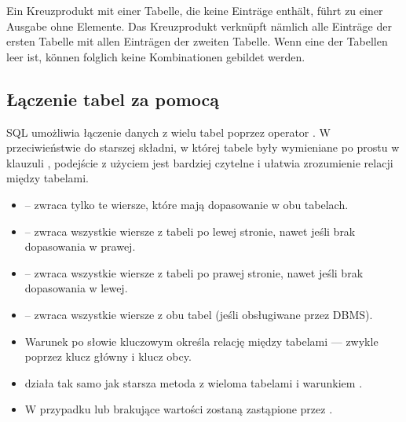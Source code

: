 \begin{tcolorbox}[red = {Hinweis}]
    Ein Kreuzprodukt mit einer Tabelle, die keine Einträge enthält, führt zu einer Ausgabe ohne Elemente. Das Kreuzprodukt verknüpft nämlich alle Einträge der ersten Tabelle mit allen Einträgen der zweiten Tabelle. Wenn eine der Tabellen leer ist, können folglich keine Kombinationen gebildet werden.
\end{tcolorbox}

\subsection{Łączenie tabel za pomocą }

SQL umożliwia łączenie danych z wielu tabel poprzez operator .  
W przeciwieństwie do starszej składni, w której tabele były wymieniane po prostu w klauzuli ,  
podejście z użyciem  jest bardziej czytelne i ułatwia zrozumienie relacji między tabelami.

\begin{itemize}
    \item {} – zwraca tylko te wiersze, które mają dopasowanie w obu tabelach.
    \item {} – zwraca wszystkie wiersze z tabeli po lewej stronie, nawet jeśli brak dopasowania w prawej.
    \item {} – zwraca wszystkie wiersze z tabeli po prawej stronie, nawet jeśli brak dopasowania w lewej.
    \item {} – zwraca wszystkie wiersze z obu tabel (jeśli obsługiwane przez DBMS).
\end{itemize}

\begin{tcolorbox}[blue={Wskazówka dotycząca JOIN}]
\begin{itemize}
    \item Warunek po słowie kluczowym  określa relację między tabelami — zwykle poprzez klucz główny i klucz obcy.
    \item {} działa tak samo jak starsza metoda z wieloma tabelami i warunkiem .
    \item W przypadku  lub  brakujące wartości zostaną zastąpione przez .
\end{itemize}
\end{tcolorbox}

